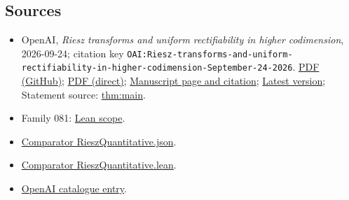 \documentclass[11pt]{article}
\begin{document}
\subsection{Sources}
\begin{itemize}
\item OpenAI, \emph{Riesz transforms and uniform rectifiability in higher codimension}, 2026-09-24; citation key \texttt{OAI:Riesz-transforms-and-uniform-rectifiability-in-higher-codimension-September-24-2026}. \href{https://github.com/openai/math/blob/adc7f1241b42e322a6451854ab7e4b4c146bf78a/preprints/Riesz-transforms-and-uniform-rectifiability-in-higher-codimension-September-24-2026/paper.pdf}{PDF (GitHub)}; \href{https://github.com/openai/math/raw/adc7f1241b42e322a6451854ab7e4b4c146bf78a/preprints/Riesz-transforms-and-uniform-rectifiability-in-higher-codimension-September-24-2026/paper.pdf}{PDF (direct)}; \href{https://github.com/openai/math/blob/adc7f1241b42e322a6451854ab7e4b4c146bf78a/preprints/Riesz-transforms-and-uniform-rectifiability-in-higher-codimension-September-24-2026/README.md}{Manuscript page and citation}; \href{https://github.com/openai/math/blob/main/preprints/Riesz-transforms-and-uniform-rectifiability-in-higher-codimension-September-24-2026/paper.pdf}{Latest version}; Statement source: \href{https://github.com/openai/math/blob/adc7f1241b42e322a6451854ab7e4b4c146bf78a/preprints/Riesz-transforms-and-uniform-rectifiability-in-higher-codimension-September-24-2026/build/sections/00-introduction.tex\#L61}{thm:main}.
\item Family 081: \href{https://github.com/openai/math/blob/adc7f1241b42e322a6451854ab7e4b4c146bf78a/lean/docs/081.md}{Lean scope}.
\item \href{https://github.com/openai/math/blob/adc7f1241b42e322a6451854ab7e4b4c146bf78a/lean/ComparatorChallenges/RieszQuantitative.json}{Comparator RieszQuantitative.json}.
\item \href{https://github.com/openai/math/blob/adc7f1241b42e322a6451854ab7e4b4c146bf78a/lean/ComparatorChallenges/RieszQuantitative.lean}{Comparator RieszQuantitative.lean}.
\item \href{https://github.com/openai/math/blob/adc7f1241b42e322a6451854ab7e4b4c146bf78a/CONTENTS.md}{OpenAI catalogue entry}.
\end{itemize}
\end{document}

